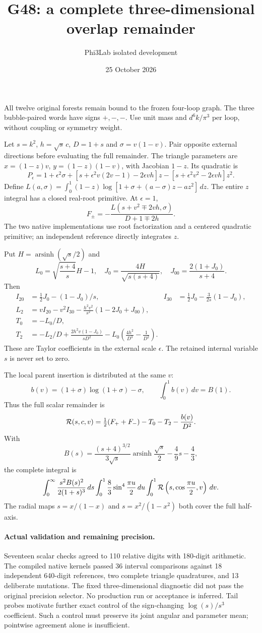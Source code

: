 \documentclass[11pt]{article}
\title{G48: a complete three-dimensional overlap remainder}
\author{Phi3Lab isolated development}
\date{25 October 2026}
\begin{document}
\maketitle
All twelve original forests remain bound to the frozen four-loop graph.
The three bubble-paired words have signs $+,-,-$.
Use unit mass and $d^6k/\pi^3$ per loop, without coupling or symmetry weight.

Let $s=k^2$, $h=\sqrt{s}\,c$, $D=1+s$ and $\sigma=v(1-v)$.
Pair opposite external directions before evaluating the full remainder.
The triangle parameters are $x=(1-z)v$, $y=(1-z)(1-v)$,
with Jacobian $1-z$. Its quadratic is
\[
 P_\epsilon=1+\epsilon^2\sigma+
 [s+\epsilon^2v(2v-1)-2\epsilon vh]z
 -[s+\epsilon^2v^2-2\epsilon vh]z^2.
\]
Define $L(a,\sigma)=\int_0^1(1-z)\log[1+\sigma+(a-\sigma)z-az^2]\,dz$.
The entire $z$ integral has a closed real-root primitive. At $\epsilon=1$,
\[
 F_\pm=-\frac{L(s+v^2\mp2vh,\sigma)}{D+1\mp2h}.
\]
The two native implementations use root factorization and a centered
quadratic primitive; an independent reference directly integrates $z$.

Put $H=\operatorname{arsinh}(\sqrt{s}/2)$ and
\[
 L_0=\sqrt{\frac{s+4}{s}}H-1,\quad
 J_0=\frac{4H}{\sqrt{s(s+4)}},\quad J_{00}=\frac{2(1+J_0)}{s+4}.
\]
Then
\begin{align*}
 I_{20}&=\tfrac12J_0-(1-J_0)/s,&
 I_{30}&=\tfrac12J_0-\tfrac{3}{2s}(1-J_0),\\
 L_2&=vI_{20}-v^2I_{30}
      -\frac{h^2v^2}{s^2}(1-2J_0+J_{00}),\\
 T_0&=-L_0/D,\\
 T_2&=-L_2/D+\frac{2h^2v(1-J_0)}{sD^2}
      -L_0\left(\frac{4h^2}{D^3}-\frac1{D^2}\right).
\end{align*}
These are Taylor coefficients in the external scale $\epsilon$.
The retained internal variable $s$ is never set to zero.

The local parent insertion is distributed at the same $v$:
\[
 b(v)=(1+\sigma)\log(1+\sigma)-\sigma,\qquad
 \int_0^1 b(v)\,dv=B(1).
\]
Thus the full scalar remainder is
\[
 {\cal R}(s,c,v)=\tfrac12(F_++F_-)-T_0-T_2-\frac{b(v)}{D^2}.
\]
With
\[
 B(s)=\frac{(s+4)^{3/2}}{3\sqrt{s}}
          \operatorname{arsinh}\frac{\sqrt{s}}2-\frac49s-\frac43,
\]
the complete integral is
\[
 \int_0^\infty\frac{s^2 B(s)^2}{2(1+s)^3}\,ds
 \int_0^1\frac83\sin^4\frac{\pi u}{2}\,du
 \int_0^1{\cal R}\left(s,\cos\frac{\pi u}{2},v\right)\,dv.
\]
The radial maps $s=x/(1-x)$ and $s=x^2/(1-x^2)$ both cover the full half-axis.

\paragraph{Actual validation and remaining precision.}
Seventeen scalar checks agreed to 110 relative digits with 180-digit
arithmetic. The compiled native kernels passed 36 interval comparisons
against 18 independent 640-digit references, two complete triangle
quadratures, and 13 deliberate mutations.
The fixed three-dimensional diagnostic did not pass the original
precision selector. No production run or acceptance is inferred.
Tail probes motivate further exact control of the sign-changing
$\log(s)/s^3$ coefficient. Such a control must preserve its joint
angular and parameter mean; pointwise agreement alone is insufficient.
\end{document}
